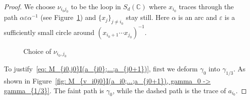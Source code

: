 \begin{proof}
We choose $\nu_{i_0j_0}$ to be the loop in $S_d(\mathbb C)$ where $x_{i_0}$ traces through the path $\alpha\varepsilon\alpha^{-1}$ (see Figure~\ref{fig: choice of nu_{i0j0}}) and $\{x_j\}_{j\neq i_0}$ stay still. Here $\alpha$ is an arc and $\varepsilon$ is a sufficiently small circle around $(x_{i_0+1}\cdots x_{j_0})^{-1}$.

\begin{figure}[H]
\centering
{}
\caption{Choice of $\nu_{i_0,j_0}$}
\label{fig: choice of nu_{i0j0}}
\end{figure}

To justify~\eqref{eq: M_{i0,j0}I(a_{i0};...;a_{j0+1})}, first we deform $\gamma_0$ into $\gamma_{1/3}$. As shown in Figure~\ref{fig: M_{v_i0j0}I(a_i0;...;a_{j0+1}), gamma_0 -> gamma_{1/3}}. The faint path is $\gamma_0$, while the dashed path is the trace of $a_{i_0}$.


\end{proof}
